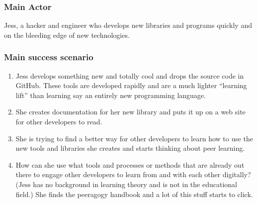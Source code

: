 \subsubsection{Main Actor}

Jess, a hacker and engineer who develops new libraries and programs
quickly and on the bleeding edge of new technologies.

\subsubsection{Main success scenario}

\begin{enumerate}
\item
  Jess develops something new and totally cool and drops the source code
  in GitHub. These tools are developed rapidly and are a much lighter
  ``learning lift'' than learning say an entirely new programming
  language.
\item
  She creates documentation for her new library and puts it up on a web
  site for other developers to read.
\item
  She is trying to find a better way for other developers to learn how
  to use the new tools and libraries she creates and starts thinking
  about peer learning.
\item
  How can she use what tools and processes or methods that are already
  out there to engage other developers to learn from and with each other
  digitally? (Jess has no background in learning theory and is not in
  the educational field.) She finds the peeragogy handbook and a lot of
  this stuff starts to click.
\end{enumerate}
